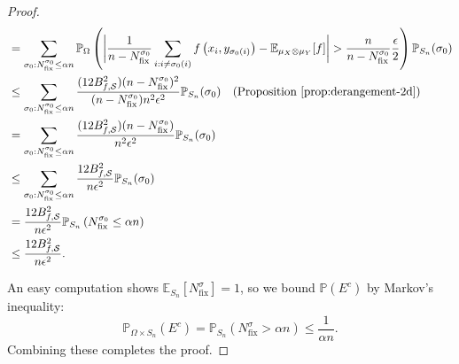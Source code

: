 \documentclass[12pt]{article}
\newcommand{\EE}{\mathbb{E}}
\newcommand{\PP}{\mathbb{P}}
\theoremstyle{definition}
\begin{document}
\begin{proof}
\[\begin{aligned}
&=   \sum_{\sigma_0: N^{\sigma_0}_{\text{fix}} \leq \alpha n }  \PP_{\Omega}\left( \bigg| \frac{1}{n-N^{\sigma_0}_{\text{fix}}} \sum_{i:i \neq \sigma_0(i)}  f\left(x_i, y_{\sigma_0(i)}\right) - \EE_{ \mu_X \otimes \mu_Y}[f] \bigg|>\frac{n}{n-N^{\sigma_0}_{\text{fix}}} \frac{\epsilon}{2}  \right) \PP_{S_n}(\sigma_0) \\
& \leq \sum_{\sigma_0: N^{\sigma_0}_{\text{fix}} \leq \alpha n } 
\frac{ (12B_{f,\mathcal{S}}^2)(n-N^{\sigma_0}_{\text{fix}})^2 }{(n - N^{\sigma_0}_{\text{fix}} ) n^2 \epsilon ^2}  \PP_{S_n}(\sigma_0) \quad (\text{Proposition }\ref{prop:derangement-2d}) \\
& = \sum_{\sigma_0: N^{\sigma_0}_{\text{fix}} \leq \alpha n }  \frac{ ( 12B_{f,\mathcal{S}}^2)(n-N^{\sigma_0}_{\text{fix}}) }{n^2 \epsilon ^2} \PP_{S_n}(\sigma_0) \\
& \leq \sum_{\sigma_0: N^{\sigma_0}_{\text{fix}} \leq \alpha n } \frac{  12B_{f,\mathcal{S}}^2}{n \epsilon ^2} \PP_{S_n}(\sigma_0)\\
& = \frac{  12B_{f,\mathcal{S}}^2}{n \epsilon ^2} \PP_{S_n}\left( N^{\sigma_0}_{\text{fix}} \leq \alpha n \right)  \\
& \le \frac{  12B_{f,\mathcal{S}}^2}{n \epsilon ^2}.
\end{aligned}
\]


An easy computation shows $\EE_{S_n}[N^{\sigma}_{\text{fix}}] = 1$, so we bound $\PP(E^c)$ by Markov's inequality:
$$
\PP_{\Omega \times S_n}(E^c ) = \PP_{S_n}(N^{\sigma}_{\text{fix}} > \alpha n) \leq \frac{1}{\alpha n}.
$$
Combining these completes the proof.
\end{proof}
\end{document}

